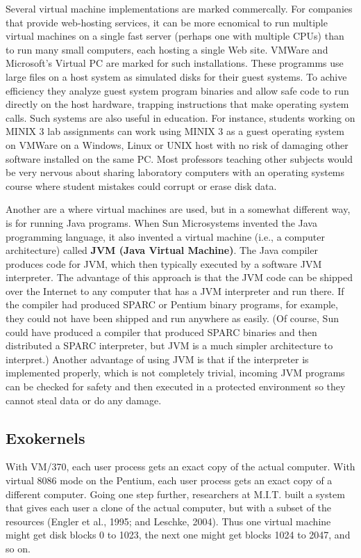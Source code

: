 \documentclass{book}
\newcommand {\kw}  [1] {\textbf{#1}}
\begin{document}
Several virtual machine implementations are marked commercally.
For companies that provide web-hosting services, it can be more ecnomical to run multiple virtual machines 
on a single fast server (perhaps one with multiple CPUs) than to run many small computers, each hosting a single Web site.
VMWare and Microsoft's Virtual PC are marked for such installations.
These programms use large files on a host system as simulated disks for their guest systems.
To achive efficiency they analyze guest system program binaries and allow safe code to run directly on the host hardware,
trapping instructions that make operating system calls.
Such systems are also useful in education.
For instance, students working on MINIX 3 lab assignments can work using MINIX 3 as a guest operating system 
on VMWare on a Windows, Linux or UNIX host with no risk of damaging other software installed on the same PC.
Most professors teaching other subjects would be very nervous about sharing laboratory computers with an operating systems course 
where student mistakes could corrupt or erase disk data.

Another are a where virtual machines are used, but in a somewhat different way, is for running Java programs.
When Sun Microsystems invented the Java programming language, 
it also invented a virtual machine (i.e., a computer architecture) called \kw{JVM (Java Virtual Machine)}.
The Java compiler produces code for JVM, which then typically executed by a software JVM interpreter.
The advantage of this approach is that the JVM code can be shipped over the Internet to any computer 
that has a JVM interpreter and run there.
If the compiler had produced SPARC or Pentium binary programs, for example, they could not have been shipped and run anywhere as easily.
(Of course, Sun could have produced a compiler that produced SPARC binaries and then distributed a SPARC interpreter, 
but JVM is a much simpler architecture to interpret.)
Another advantage of using JVM is that if the interpreter is implemented properly, which is not completely trivial, 
incoming JVM programs can be checked for safety and then executed in a protected environment so they cannot steal data or do any damage.

\subsection{Exokernels}
With VM/370, each user process gets an exact copy of the actual computer.
With virtual 8086 mode on the Pentium, each user process gets an exact copy of a different computer.
Going one step further, researchers at M.I.T. built a system that gives each user a clone of the actual computer,
but with a subset of the resources (Engler et al., 1995; and Leschke, 2004).
Thus one virtual machine might get disk blocks 0 to 1023, 
the next one might get blocks 1024 to 2047, and so on.
\end{document}
